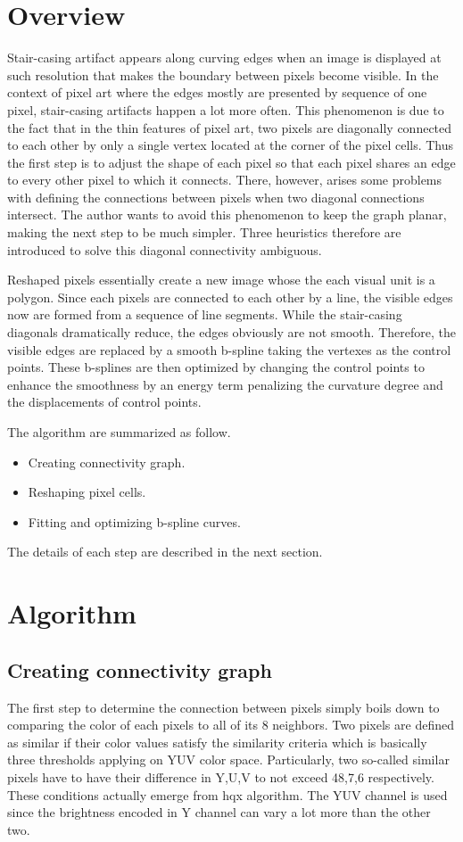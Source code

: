 \documentclass{article}
\begin{document}
\section{Overview}
Stair-casing artifact appears along curving edges when an image is displayed at such resolution that makes the boundary between pixels become visible. In the context of pixel art where the edges mostly are presented by sequence of one pixel, stair-casing artifacts happen a lot more often. This phenomenon is due to the fact that in the thin features of pixel art, two pixels are diagonally connected to each other by only a single vertex located at the corner of the pixel cells. Thus the first step is to adjust the shape of each pixel so that each pixel shares an edge to every other pixel to which it connects. There, however, arises some problems with defining the connections between pixels when two diagonal connections intersect. The author wants to avoid this phenomenon to keep the graph planar, making the next step to be much simpler. Three heuristics therefore are introduced to solve this diagonal connectivity ambiguous. 

Reshaped pixels essentially create a new image whose the each visual unit is a polygon. Since each pixels are connected to each other by a line, the visible edges now are formed from a sequence of line segments. While the stair-casing diagonals dramatically reduce, the edges obviously are not smooth. Therefore, the visible edges are replaced by a smooth b-spline taking the vertexes as the control points. These b-splines are then optimized by changing the control points to enhance the smoothness by an energy term penalizing the curvature degree and the displacements of control points.

The algorithm are summarized as follow.
\begin{itemize}
\item Creating connectivity graph.
\item Reshaping pixel cells.
\item Fitting and optimizing b-spline curves.
\end{itemize}
The details of each step are described in the next section.
\section{Algorithm}
\subsection{Creating connectivity graph}
The first step to determine the connection between pixels simply boils down to comparing the color of each pixels to all of its 8 neighbors. Two pixels are defined as similar if their color values satisfy the similarity criteria which is basically three thresholds applying on YUV color space. Particularly, two so-called similar pixels have to have their difference in Y,U,V to not exceed 48,7,6 respectively. These conditions actually emerge from hqx algorithm. The YUV channel is used since the brightness encoded in Y channel can vary a lot more than the other two.
\end{document}
